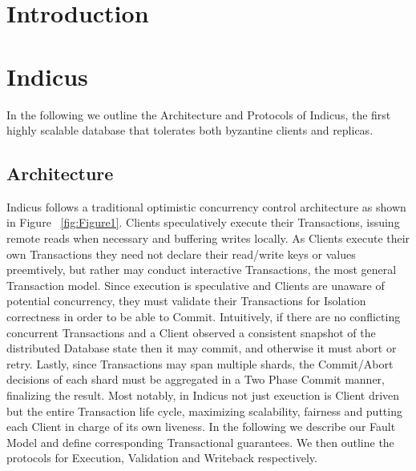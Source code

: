 \section{Introduction}






\section{Indicus}
In the following we outline the Architecture and Protocols of Indicus, the first highly scalable database that tolerates both byzantine clients and replicas.
\subsection{Architecture}
Indicus follows a traditional optimistic concurrency control architecture as shown in Figure ~\ref{fig:Figure1}. Clients speculatively execute their Transactions, issuing remote reads when necessary and buffering writes locally. As Clients execute their own Transactions they need not declare their read/write keys or values preemtively, but rather may conduct interactive Transactions, the most general Transaction model. Since execution is speculative and Clients are unaware of potential concurrency, they must validate their Transactions for Isolation correctness in order to be able to Commit. Intuitively, if there are no conflicting concurrent Transactions and a Client observed a consistent snapshot of the distributed Database state then it may commit, and otherwise it must abort or retry. Lastly, since Transactions may span multiple shards, the Commit/Abort decisions of each shard must be aggregated in a Two Phase Commit manner, finalizing the result. Most notably, in Indicus not just exeuction is Client driven but the entire Transaction life cycle, maximizing scalability, fairness and putting each Client in charge of its own liveness.
In the following we describe our Fault Model and define corresponding Transactional guarantees. We then outline the protocols for Execution, Validation and Writeback respectively.

